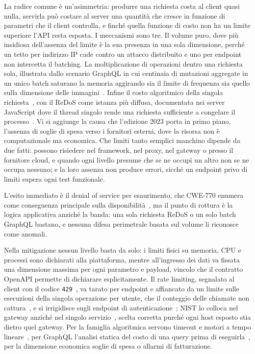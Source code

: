 La radice comune è un'asimmetria: produrre una richiesta costa al client quasi
nulla, servirla può costare al server una quantità che cresce in funzione di
parametri che il client controlla, e finché quella funzione di costo non ha un
limite superiore l'API resta esposta. I meccanismi sono tre. Il volume puro,
dove più insidiosa dell'assenza del limite è la sua presenza in una sola
dimensione, perché un tetto per indirizzo IP cade contro un attacco distribuito
e uno per endpoint non intercetta il batching. La moltiplicazione di operazioni
dentro una richiesta sola, illustrata dallo scenario GraphQL in cui centinaia
di mutazioni aggregate in un unico batch saturano la memoria aggirando sia il
limite di frequenza sia quello sulla dimensione delle
immagini~\cite{owasp2023api4,cha2020graphql}. Infine il costo algoritmico della
singola richiesta~\cite{crosby2003algorithmic}, con il ReDoS come istanza più
diffusa, documentata nei server JavaScript dove il thread singolo rende una
richiesta sufficiente a congelare il processo~\cite{staicu2018redos}. Vi si
aggiunge la causa che l'edizione 2023 porta in primo piano, l'assenza di soglie
di spesa verso i fornitori esterni, dove la risorsa non è computazionale ma
economica. Che limiti tanto semplici manchino dipende da due fatti: possono
risiedere nel framework, nel proxy, nel gateway o presso il fornitore cloud, e
quando ogni livello presume che se ne occupi un altro non se ne occupa nessuno;
e la loro assenza non produce errori, sicché un endpoint privo di limiti supera
ogni test funzionale.

L'esito immediato è il denial of service per esaurimento, che
CWE-770 enumera
come conseguenza principale sulla disponibilità~\cite{cwe770}, ma il punto di
rottura è la logica applicativa anziché la banda: una sola richiesta
ReDoS o un
solo batch GraphQL bastano, e nessuna difesa perimetrale basata sul volume li
riconosce come anomali.

Nella mitigazione nessun livello basta da solo: i limiti fisici su memoria, CPU
e processi sono dichiarati alla piattaforma, mentre all'ingresso dei dati va
fissata una dimensione massima per ogni parametro e payload, vincolo che il
contratto OpenAPI permette di dichiarare esplicitamente. Il rate limiting,
segnalato al client con il codice
\texttt{429}~\cite{rfc6585,polli2026ratelimit}, va tarato per endpoint e
affiancato da un limite sulle esecuzioni della singola operazione per utente,
che il conteggio delle chiamate non cattura~\cite{owasp2023api4}, e si
irrigidisce sugli endpoint di
autenticazione~\cite{owasp2023api2,nist2025sp80063b}; NIST lo colloca nel
gateway anziché nel singolo servizio~\cite{nist2019sp800204}, scelta corretta
purché ogni host esposto stia dietro quel gateway. Per la famiglia algoritmica
servono timeout e motori a tempo lineare~\cite{staicu2018redos}, per GraphQL
l'analisi statica del costo di una query prima di
eseguirla~\cite{cha2020graphql}, per la dimensione economica soglie di spesa o
allarmi di fatturazione.


